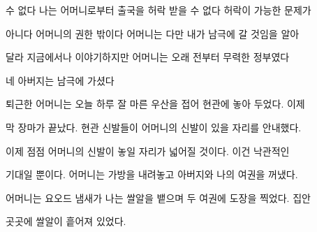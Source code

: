 수 없다 나는 어머니로부터 출국을 허락 받을 수 없다 허락이 가능한 문제가

아니다 어머니의 권한 밖이다 어머니는 다만 내가 남극에 갈 것임을 알아

달라 지금에서나 이야기하지만 어머니는 오래 전부터 무력한 정부였다



네 아버지는 남극에 가셨다



퇴근한 어머니는 오늘 하루 잘 마른 우산을 접어 현관에 놓아 두었다. 이제

막 장마가 끝났다. 현관 신발들이 어머니의 신발이 있을 자리를 안내했다.

이제 점점 어머니의 신발이 놓일 자리가 넓어질 것이다. 이건 낙관적인

기대일 뿐이다. 어머니는 가방을 내려놓고 아버지와 나의 여권을 꺼냈다.

어머니는 요오드 냄새가 나는 쌀알을 뱉으며 두 여권에 도장을 찍었다. 집안

곳곳에 쌀알이 흩어져 있었다.

